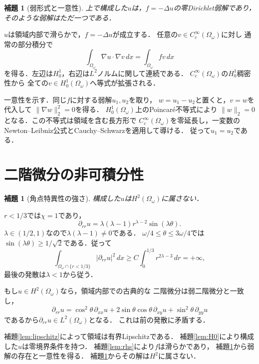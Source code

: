 \documentclass[a5paper,10pt,onecolumn]{jsarticle}
\makeatletter
\theoremstyle{mathnotetheorem}
\newtheorem{lemma}[theorem]{補題}
\renewcommand{\proofname}{証明}
\renewenvironment{proof}[1][\proofname]{%
  \par\pushQED{\qed}\normalfont\topsep4\p@\@plus2\p@\relax
  \trivlist\item[\hskip\labelsep\bfseries #1]\ignorespaces
}{\popQED\endtrivlist\@endpefalse}
\makeatother
\begin{document}
\begin{lemma}[弱形式と一意性]\label{lem:weak}
上で構成した$u$は，$f=-\Delta u$の零Dirichlet弱解であり，
そのような弱解はただ一つである．
\end{lemma}
\begin{proof}
$u$は領域内部で滑らかで，$f=-\Delta u$が成立する．
任意の$v\in C_c^\infty(\Omega_\omega)$に対し
通常の部分積分で
\[
 \int_{\Omega_\omega}\nabla u\cdot\nabla v\,dx
   =\int_{\Omega_\omega}fv\,dx
\]
を得る．左辺は$H_0^1$，右辺は$L^2$ノルムに関して連続である．
$C_c^\infty(\Omega_\omega)$の$H_0^1$稠密性から
全ての$v\in H_0^1(\Omega_\omega)$へ等式が拡張される．

一意性を示す．同じ$f$に対する弱解$u_1,u_2$を取り，
$w=u_1-u_2$と置くと，$v=w$を代入して
$\|\nabla w\|_2^2=0$を得る．
$H_0^1(\Omega_\omega)$上のPoincar\'e不等式により
$\|w\|_2=0$となる．この不等式は領域を含む長方形で
$C_c^\infty(\Omega_\omega)$を零延長し，一変数の
Newton--Leibniz公式とCauchy--Schwarzを適用して導ける．
従って$u_1=u_2$である．
\end{proof}

\section{二階微分の非可積分性}
\begin{lemma}[角点特異性の強さ]\label{lem:notH2}
構成した$u$は$H^2(\Omega_\omega)$に属さない．
\end{lemma}
\begin{proof}
$r<1/3$では$\chi=1$であり，
\[
 \partial_{rr}u
   =\lambda(\lambda-1)r^{\lambda-2}\sin(\lambda\theta).
\]
$\lambda\in(1/2,1)$なので$\lambda(\lambda-1)\ne0$である．
$\omega/4\le\theta\le3\omega/4$では
$\sin(\lambda\theta)\ge1/\sqrt2$である．従って
\[
 \int_{\Omega_\omega\cap\{r<1/3\}}
       |\partial_{rr}u|^2\,dx
 \ge C\int_0^{1/3}r^{2\lambda-3}\,dr=+\infty,
\]
最後の発散は$\lambda<1$から従う．

もし$u\in H^2(\Omega_\omega)$なら，領域内部での古典的な
二階微分は弱二階微分と一致し，
\[
 \partial_{rr}u
 =\cos^2\theta\,\partial_{xx}u
  +2\sin\theta\cos\theta\,\partial_{xy}u
  +\sin^2\theta\,\partial_{yy}u
\]
であるから$\partial_{rr}u\in L^2(\Omega_\omega)$となる．
これは前の発散に矛盾する．
\end{proof}

\begin{proof}[定理\ref{thm:corner}の証明]
補題\ref{lem:lipschitz}によって領域は有界Lipschitzである．
補題\ref{lem:H0}により構成した$u$は零境界条件を持つ．
補題\ref{lem:rhs}により$f$は滑らかであり，
補題\ref{lem:weak}から弱解の存在と一意性を得る．
補題\ref{lem:notH2}からその解は$H^2$に属さない．
\end{proof}
\end{document}
